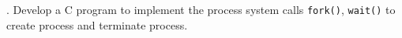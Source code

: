 \documentclass{article}
\begin{document}
	. Develop a C program to implement the process system calls \verb|fork()|, \verb|wait()| to create process and terminate process.

	\inputminted{c}{lab1.c}
\end{document}
